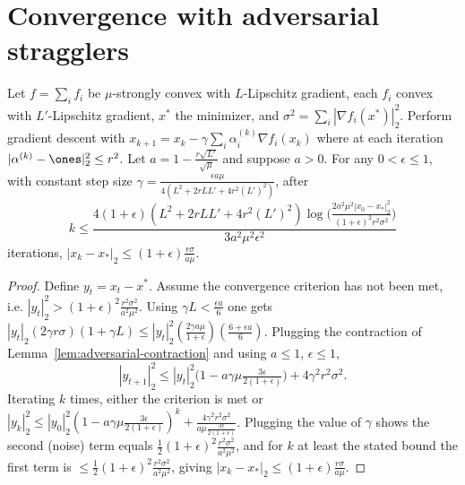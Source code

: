 \chapter{Convergence with adversarial stragglers}

\begin{proposition}
  \label{prop:convergence-adversarial}
  Let $f = \sum_i f_i$ be $\mu$-strongly convex with $L$-Lipschitz gradient,
  each $f_i$ convex with $L'$-Lipschitz gradient, $x^*$ the minimizer, and
  $\sigma^2 = \sum_i|\nabla f_i(x^*)|_2^2$. Perform gradient descent with
  $x_{k+1} = x_k - \gamma\sum_i \alpha_i^{(k)}\nabla f_i(x_k)$ where at each
  iteration $|\alpha^{(k)} - \ones|_2^2 \le r^2$. Let $a = 1 - \tfrac{r\sqrt{L'}}{\sqrt\mu}$
  and suppose $a > 0$. For any $0 < \epsilon \le 1$, with constant step size
  $\gamma = \tfrac{\epsilon a\mu}{4(L^2 + 2rLL' + 4r^2(L')^2)}$, after
  \[
    k \le \frac{4(1+\epsilon)(L^2 + 2rLL' + 4r^2(L')^2)
      \log\big(\tfrac{2a^2\mu^2|x_0 - x_*|_2^2}{(1+\epsilon)^2 r^2\sigma^2}\big)}
      {3a^2\mu^2\epsilon^2}
  \]
  iterations, $|x_k - x_*|_2 \le (1 + \epsilon)\tfrac{r\sigma}{a\mu}$.
\end{proposition}
\begin{proof}
  Define $y_t = x_t - x^*$. Assume the convergence criterion has not been met,
  i.e. $|y_t|_2^2 > (1+\epsilon)^2\tfrac{r^2\sigma^2}{a^2\mu^2}$. Using
  $\gamma L < \tfrac{\epsilon a}{6}$ one gets
  $|y_t|_2(2\gamma r\sigma)(1 + \gamma L) \le |y_t|_2^2(\tfrac{2\gamma a\mu}{1+\epsilon})(\tfrac{6+\epsilon a}{6})$.
  Plugging the contraction of Lemma~\ref{lem:adversarial-contraction} and using
  $a \le 1$, $\epsilon \le 1$,
  \[
    |y_{t+1}|_2^2 \le |y_t|_2^2\Big(1 - a\gamma\mu\tfrac{3\epsilon}{2(1+\epsilon)}\Big)
      + 4\gamma^2 r^2\sigma^2 .
  \]
  Iterating $k$ times, either the criterion is met or
  $|y_k|_2^2 \le |y_0|_2^2(1 - a\gamma\mu\tfrac{3\epsilon}{2(1+\epsilon)})^k
   + \tfrac{4\gamma^2 r^2\sigma^2}{a\mu\frac{3\epsilon}{2(1+\epsilon)}}$.
  Plugging the value of $\gamma$ shows the second (noise) term equals
  $\tfrac12(1+\epsilon)^2\tfrac{r^2\sigma^2}{a^2\mu^2}$, and for $k$ at least the
  stated bound the first term is $\le \tfrac12(1+\epsilon)^2\tfrac{r^2\sigma^2}{a^2\mu^2}$,
  giving $|x_k - x_*|_2 \le (1+\epsilon)\tfrac{r\sigma}{a\mu}$.
\end{proof}

